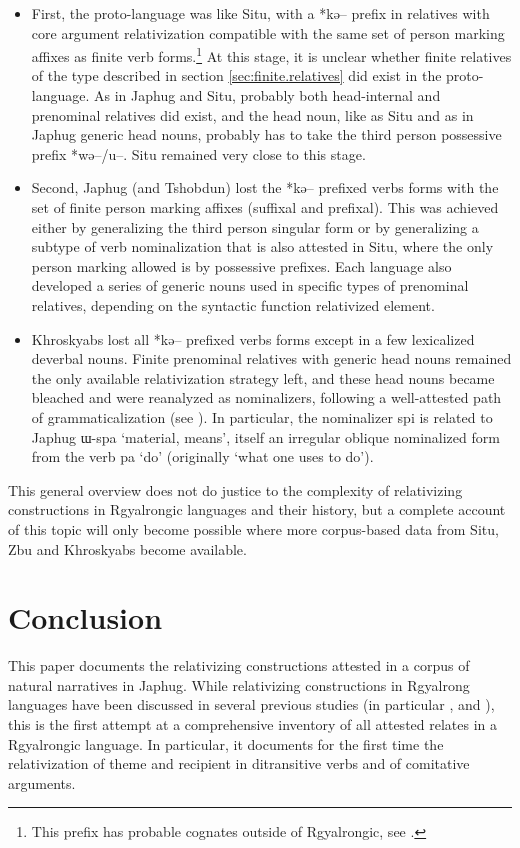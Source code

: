\documentclass[oldfontcommands,oneside,a4paper,11pt]{article}
\newcommand{\ipa}[1]{{\phon #1}} %
\begin{document}
\begin{itemize}

 \item First, the proto-language was like Situ, with a *\ipa{kə--} prefix in relatives with core argument relativization compatible with the same set of person marking affixes as finite verb forms.\footnote{This prefix has probable cognates outside of Rgyalrongic, see \citet{konnerth09nmlz}.} At this stage, it is unclear whether finite relatives of the type described in section \ref{sec:finite.relatives} did exist in the proto-language. As in Japhug and Situ, probably both head-internal and prenominal relatives did exist, and the head noun, like as Situ and as in Japhug generic head nouns, probably has to take the third person possessive prefix *\ipa{wə--/u--}. Situ remained very close to this stage.

\item Second, Japhug (and Tshobdun) lost the *\ipa{kə--} prefixed  verbs  forms with the set of finite person marking affixes (suffixal and prefixal). This was achieved either by generalizing the third person singular form or by generalizing a subtype of verb nominalization that is also attested in Situ, where the only person marking allowed is by possessive prefixes. Each language also developed a series of generic nouns used in specific types of prenominal relatives, depending on the syntactic function  relativized element.

\item Khroskyabs lost all *\ipa{kə--} prefixed  verbs  forms except in a few lexicalized deverbal nouns. Finite prenominal relatives with generic head nouns remained the only available relativization strategy left, and these head nouns became bleached and were reanalyzed as nominalizers, following a well-attested path of grammaticalization (see \citealt{genetti08nmlz}). In particular, the nominalizer \ipa{spi} is related to Japhug \ipa{ɯ-spa} `material, means', itself an irregular oblique nominalized form from the verb \ipa{pa} `do' (originally `what one uses to do').

\end{itemize}

This general overview does not do justice to the complexity of relativizing constructions in Rgyalrongic languages and their history, but a complete account of this topic will only become possible where more corpus-based data  from Situ, Zbu and Khroskyabs become available.

\section{Conclusion}
This paper documents the relativizing constructions attested in a corpus of natural narratives in Japhug. While relativizing constructions in Rgyalrong languages have been discussed in several previous studies (in particular \citealt{jackson06guanxiju}, \citealt{jacksonlin07} and \citealt{jacques08}), this is the first attempt at a comprehensive inventory of all attested relates in a Rgyalrongic language. In particular, it documents for the first time the relativization of theme and recipient in ditransitive verbs and of comitative arguments. 
\end{document}
